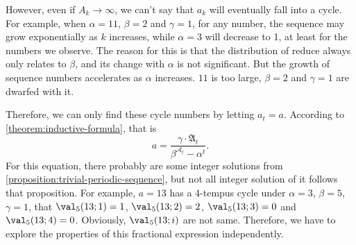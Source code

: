 However, even if $A_{k}\to \infty$, we can't say that $a_k$ will eventually fall into a cycle.
For example, when $\alpha = 11$, $\beta = 2$ and $\gamma = 1$, for any number, the sequence may grow exponentially as $k$ increases, while $\alpha = 3$ will decrease to 1, at least for the numbers we observe.
The reason for this is that the distribution of reduce always only relates to $\beta$, and its change with $\alpha$ is not significant.
But the growth of sequence numbers accelerates as $\alpha$ increases. $11$ is too large, $\beta=2$ and $\gamma=1$ are dwarfed with it.

Therefore, we can only find these cycle numbers by letting $a_{t} = a$.
According to \cref{theorem:inductive-formula}, that is
\[ a = \frac{\gamma \cdot \mathfrak{A}_{t}}{\beta^{\mathcal{A}_{t}} - \alpha^{t}}. \]
For this equation, there probably are some integer solutions from \cref{proposition:trivial-periodic-sequence}, but not all integer solution of it follows that proposition.
For example, $a=13$ has a 4-tempus cycle under $\alpha=3$, $\beta=5$, $\gamma=1$, that $\val_{5}(13;1) = 1$, $\val_{5}(13;2) = 2$, $\val_{5}(13;3) = 0$ and $\val_{5}(13;4) = 0$.
Obviously, $\val_{5}(13;i)$ are not same.
Therefore, we have to explore the properties of this fractional expression independently.
